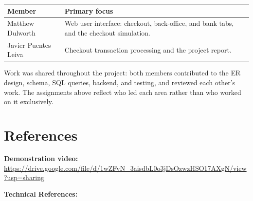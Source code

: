 \documentclass[11pt,letterpaper]{article}
\begin{document}
\begin{center}
\small
\begin{tabularx}{\textwidth}{@{}p{}X@{}}
\hline
Member & Primary focus \\ \hline
Matthew Dulworth & Web user interface: checkout, back-office, and bank tabs, and the checkout simulation. \\
Javier Puentes Leiva & Checkout transaction processing and the project report. \\ \hline
\end{tabularx}
\end{center}

Work was shared throughout the project: both members contributed to the ER design, schema, SQL queries, backend, and testing, and reviewed each other's work. The assignments above reflect who led each area rather than who worked on it exclusively.


\section{References}

\textbf{Demonstration video:}\\
\url{https://drive.google.com/file/d/1wZFvN_3aisdbL0o3jDsOzwzHSO17AXgN/view?usp=sharing}

\vspace{0.35em}
\noindent\textbf{Technical References:}
\end{document}
